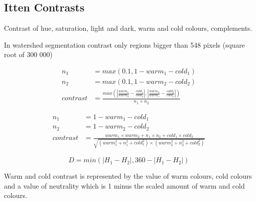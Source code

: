 \documentclass[11pt,a4paper,draft]{report}
\begin{document}
\begin{multicols}{2}
\subsection{Itten Contrasts}

Contrast of hue, saturation, light and dark, warm and cold colours,
complements.

In watershed segmentation contrast only regions bigger than 548 pixels (square
root of 300 000)

\begin{figure}[!htb]
\begin{equation}
\begin{aligned}
n_1       &= max(0.1, 1 - warm_1 - cold_1) \\
n_2       &= max(0.1, 1 - warm_2 - cold_2) \\
contrast  &= \frac{ max\left( \left\lvert \frac{warm_1}{warm_2}
                                        - \frac{cold_1}{cold_2} \right\rvert
                            , \left\lvert \frac{warm_2}{warm_1}
                                        - \frac{cold_2}{cold_1} \right\rvert
                       \right)
                 }{ n_1 \times n_2 }
\label{eq:coldwarm}
\end{aligned}
\end{equation}
\end{figure}

\begin{figure}[!htb]
\begin{equation}
\begin{aligned}
n_1       &= 1 - warm_1 - cold_1 \\
n_2       &= 1 - warm_2 - cold_2 \\
contrast  &= \frac{ warm_1 \times warm_2
                   + n_1    \times n_2
                   + cold_1 \times cold_2
                  }{ \sqrt{      (warm_1^2 + n_1^2 + cold_1^2)
                          \times (warm_2^2 + n_2^2 + cold_2^2) } }
\label{eq:mach}
\end{aligned}
\end{equation}
\end{figure}

\begin{figure}[!htb]
\begin{equation}
D = min( \lvert H_1 - H_2 \rvert , 360 - \lvert H_1 - H_2 \rvert )
\label{eq:wheel}
\end{equation}
\end{figure}

Warm and cold contrast is represented by the value of warm colours, cold
colours and a value of neutrality which is 1 minus the scaled amount of warm
and cold colours.


\end{multicols}
\end{document}
